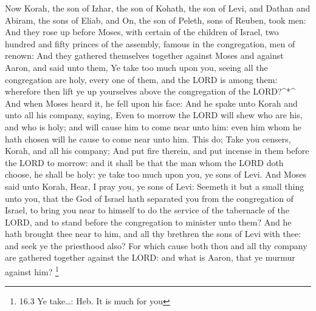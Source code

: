  Now Korah, the son of Izhar, the son of Kohath, the son of
Levi, and Dathan and Abiram, the sons of Eliab, and On, the son of
Peleth, sons of Reuben, took men:  And they rose up before
Moses, with certain of the children of Israel, two hundred and fifty
princes of the assembly, famous in the congregation, men of renown:
 And they gathered themselves together against Moses and
against Aaron, and said unto them, Ye take too much upon you, seeing all
the congregation are holy, every one of them, and the LORD is among
them: wherefore then lift ye up yourselves above the congregation of the
LORD?\^{}*\^{}  And when Moses heard it, he fell upon his
face:  And he spake unto Korah and unto all his company,
saying, Even to morrow the LORD will shew who are his, and who is holy;
and will cause him to come near unto him: even him whom he hath chosen
will he cause to come near unto him.  This do; Take you
censers, Korah, and all his company;  And put fire therein,
and put incense in them before the LORD to morrow: and it shall be that
the man whom the LORD doth choose, he shall be holy: ye take too much
upon you, ye sons of Levi.  And Moses said unto Korah, Hear,
I pray you, ye sons of Levi:  Seemeth it but a small thing
unto you, that the God of Israel hath separated you from the
congregation of Israel, to bring you near to himself to do the service
of the tabernacle of the LORD, and to stand before the congregation to
minister unto them?  And he hath brought thee near to him,
and all thy brethren the sons of Levi with thee: and seek ye the
priesthood also?  For which cause both thou and all thy
company are gathered together against the LORD: and what is Aaron, that
ye murmur against him? \footnote{16.3 Ye take\ldots: Heb. It is much for
  you}

